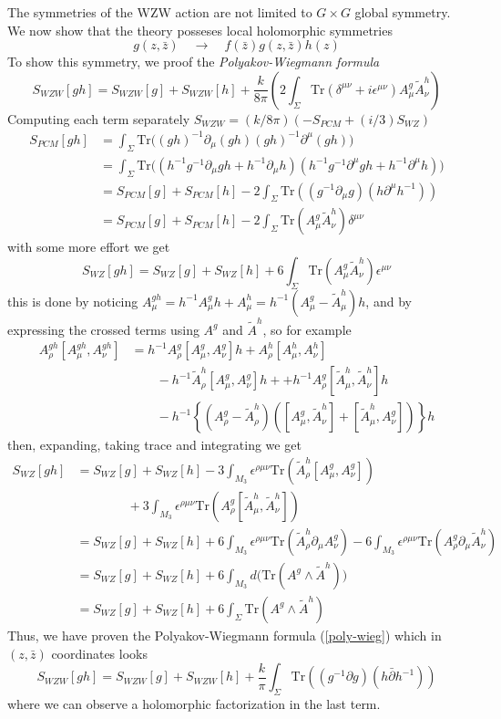 \documentclass[a4paper,12pt]{article}
\numberwithin{equation}{section}
\numberwithin{thm}{section}
\numberwithin{exm}{section}
\newcommand{\p}{\partial}
\newcommand{\pb}{\bar\partial}
\newcommand{\tr}{\mathrm{Tr}}
\newcommand{\wt}{\widetilde}
\newcommand{\mo}{^{-1}}
\newcommand{\we}{{\wedge}}
\newcommand{\zb}{{\bar z}}
\newcommand{\<}{{\langle}}
\renewcommand{\>}{{\rangle}}
\renewcommand{\d}{{\delta}}
\newcommand{\e}{{\epsilon}}
\newcommand{\m}{{\mu}}
\newcommand{\n}{{\nu}}
\renewcommand{\r}{{\rho}}
\renewcommand{\S}{{\Sigma}}
\begin{document}
The symmetries of the WZW action are not limited to $G\times G$ global symmetry. We now show that the theory posseses local holomorphic symmetries
	\begin{equation}
	g(z,\zb)\quad\rightarrow\quad f(\zb) g(z,\zb) h(z)
	\end{equation}
To show this symmetry, we proof the {\it Polyakov-Wiegmann formula}
	\begin{equation}\label{poly-wieg}
	S_{WZW}[gh] = S_{WZW}[g] + S_{WZW}[h] + \frac{k}{8\pi}\left(2\int_\S \tr(\d^{\m\n}+i\e^{\m\n})A_\m^g \wt A_\n^h \right)
	\end{equation}
Computing each term separately $S_{WZW} = (k/8\pi)(-S_{PCM} + (i/3) S_{WZ})$
	\begin{align}
	S_{PCM}[gh] & = \int_\S \tr\Big( (gh)\mo \p_\m (gh) (gh)\mo \p^\m (gh) \Big) \\
	& = \int_\S \tr\Big( (h\mo g\mo\p_\m g h + h\mo \p_\m h)(h\mo g\mo \p^\m g h + h\mo\p^\m h) \Big) \\
	& = S_{PCM}[g] + S_{PCM}[h] - 2 \int_\S \tr((g\mo\p_\m g) (h\p^\m h\mo)) \\
	& = S_{PCM}[g] + S_{PCM}[h] - 2 \int_\S \tr(A^g_\m \wt A^h_\n)\d^{\m\n}
	\end{align}
with some more effort we get
	\begin{equation}
	S_{WZ}[gh] = S_{WZ}[g] + S_{WZ}[h] + 6 \int_\S \tr (A_\m^g \wt A^h_\n) \e^{\m\n} 
	\end{equation}
this is done by noticing $A^{gh}_\m = h\mo A^g_\m h + A^h_\m = h\mo(A^g_\m - \wt A^h_\m)h$, and by expressing the crossed terms using $A^g$ and $\wt A^h$, so for example
	\begin{align}
	A^{gh}_\r[A^{gh}_\m, A^{gh}_\n] & = h\mo A^g_\r[A^g_\m, A^g_\n] h + A^h_\r[A^h_\m, A^h_\n] \nonumber \\
	& \qquad - h\mo \wt A^h_\r [A^g_\m, A^g_\n] h +  + h\mo A^g_\r [\wt A^h_\m, \wt A^h_\n] h \nonumber \\
	& \qquad - h\mo \left\{(A^g_\r - \wt A^h_\r)([A^g_\m, \wt A^h_\n] + [\wt A^h_\m, A^g_\n])\right\} h
	\end{align}
then, expanding, taking trace and integrating we get
	\begin{align}
	S_{WZ}[gh] & = S_{WZ}[g] + S_{WZ}[h] - 3\int_{M_3} \e^{\r\m\n} \tr(\wt A^h_\r [A^g_\m, A^g_\n]) \nonumber \\
	& \qquad\qquad + 3\int_{M_3} \e^{\r\m\n} \tr(A^g_\r[\wt A^h_\m, \wt A^h_\n]) \nonumber \\
	& = S_{WZ}[g] + S_{WZ}[h] + 6\int_{M_3} \e^{\r\m\n}\tr(\wt A^h_\r\p_\m A^g_\n) - 6\int_{M_3} \e^{\r\m\n}\tr(A^g_\r \p_\m\wt A^h_\n) \nonumber \\
	& = S_{WZ}[g] + S_{WZ}[h] + 6 \int_{M_3} d\Big( \tr(A^g\we \wt A^h) \Big) \nonumber \\
	& = S_{WZ}[g] + S_{WZ}[h] + 6 \int_\S \tr(A^g\we \wt A^h)
	\end{align}
Thus, we have proven the Polyakov-Wiegmann formula (\ref{poly-wieg}) which in $(z,\zb)$ coordinates looks
	\begin{equation}
	S_{WZW}[gh] = S_{WZW}[g] + S_{WZW}[h] + \frac{k}{\pi} \int_\S \tr( (g\mo\p g)(h\pb h\mo) )
	\end{equation}
where we can observe a holomorphic factorization in the last term.
\end{document}
